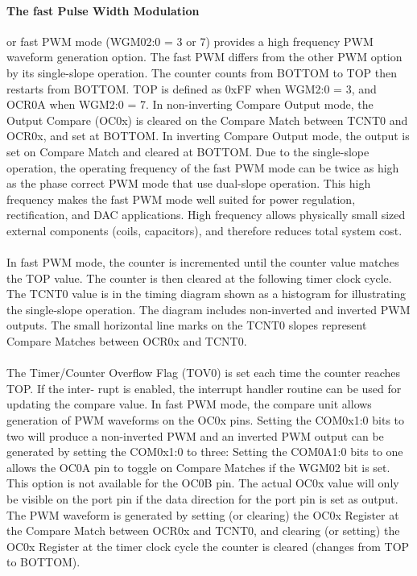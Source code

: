 \documentclass[english]{article}
\begin{document}
\paragraph{The fast Pulse Width Modulation}  or fast PWM mode (WGM02:0 = 3 or 7) provides a high frequency PWM waveform generation option. The fast PWM differs from the other PWM option by its single-slope operation. The counter counts from BOTTOM to TOP then restarts from BOTTOM. TOP is defined as 0xFF when WGM2:0 = 3, and OCR0A when WGM2:0 = 7. In non-inverting Compare Output mode, the Output Compare (OC0x) is cleared on the Compare Match between TCNT0 and OCR0x, and set at BOTTOM. In inverting Compare Output mode, the output is set on Compare Match and cleared at BOTTOM. Due to the single-slope operation, the operating frequency of the fast PWM mode can be twice as high as the phase correct PWM mode that use dual-slope operation. This high frequency makes the fast PWM mode well suited for power regulation, rectification, and DAC applications. High frequency allows physically small sized external components (coils, capacitors), and therefore reduces total system cost.\\\\
In fast PWM mode, the counter is incremented until the counter value matches the TOP value. The counter is then cleared at the following timer clock cycle. The TCNT0 value is in the timing diagram shown as a histogram for illustrating the single-slope operation. The diagram includes non-inverted and inverted PWM outputs. The small horizontal line marks on the TCNT0 slopes represent Compare Matches between OCR0x and TCNT0.\\\\
The Timer/Counter Overflow Flag (TOV0) is set each time the counter reaches TOP. If the inter-
rupt is enabled, the interrupt handler routine can be used for updating the compare value.
In fast PWM mode, the compare unit allows generation of PWM waveforms on the OC0x pins.
Setting the COM0x1:0 bits to two will produce a non-inverted PWM and an inverted PWM output
can be generated by setting the COM0x1:0 to three: Setting the COM0A1:0 bits to one allows
the OC0A pin to toggle on Compare Matches if the WGM02 bit is set. This option is not available
for the OC0B pin. The actual OC0x value will only be visible on the port pin if the data direction for the port pin is set as output. The PWM waveform is generated by setting (or clearing) the OC0x Register at the Compare Match between OCR0x and TCNT0, and clearing (or setting) the OC0x Register
at the timer clock cycle the counter is cleared (changes from TOP to BOTTOM).\\\\
\end{document}
